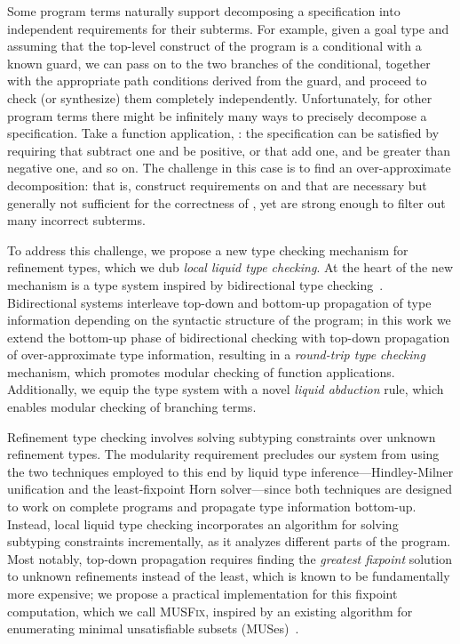\documentclass[10pt,preprint]{sigplanconf-pldi16}
\theoremstyle{definition}
\begin{document}
Some program terms naturally support decomposing a specification into independent requirements for their subterms.
For example, 
given a goal type  and assuming that the top-level construct of the program is a conditional with a known guard,
we can pass  on to the two branches of the conditional, together with the appropriate path conditions derived from the guard,
and proceed to check (or synthesize) them completely independently.
Unfortunately, for other program terms there might be infinitely many ways to precisely decompose a specification.
Take a function application, :
the specification 
can be satisfied by requiring that  subtract one and  be positive,
or that  add one, and  be greater than negative one, and so on.
The challenge in this case is to find an over-approximate decomposition:
that is, construct requirements on  and  that are necessary but generally not sufficient for the correctness of ,
yet are strong enough to filter out many incorrect subterms.

To address this challenge, we propose a new type checking mechanism for refinement types, 
which we dub \emph{local liquid type checking}.
At the heart of the new mechanism is a type system
inspired by bidirectional type checking~\cite{PierceTu00}.
Bidirectional systems interleave top-down and bottom-up propagation of type information 
depending on the syntactic structure of the program;
in this work we extend the bottom-up phase of bidirectional checking with top-down propagation of over-approximate type information,
resulting in a \emph{round-trip type checking} mechanism, which promotes modular checking of function applications. 
Additionally, we equip the type system with a novel \emph{liquid abduction} rule,
which enables modular checking of branching terms.

Refinement type checking involves
solving subtyping constraints over unknown refinement types.
The modularity requirement precludes our system from using the two techniques employed to this end by liquid type inference---Hindley-Milner unification and the least-fixpoint Horn solver---since both techniques are designed to work on complete programs and propagate type information bottom-up.
Instead, local liquid type checking incorporates an algorithm for solving subtyping constraints incrementally, as it analyzes different parts of the program.
Most notably, top-down propagation requires finding the \emph{greatest fixpoint} solution to unknown refinements instead of the least,
which is known to be fundamentally more expensive;
we propose a practical implementation for this fixpoint computation, 
which we call \textsc{MUSFix},
inspired by an existing algorithm for enumerating minimal unsatisfiable subsets (MUSes)~\cite{LiffitonPrMaMa15}.
\end{document}
